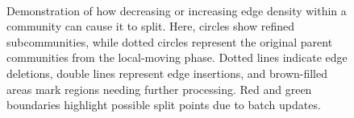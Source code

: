 \begin{figure}[hbtp]
  \centering
   \\[-1ex]
  \caption{Demonstration of how decreasing or increasing edge density within a community can cause it to split. Here, circles show refined subcommunities, while dotted circles represent the original parent communities from the local-moving phase. Dotted lines indicate edge deletions, double lines represent edge insertions, and brown-filled areas mark regions needing further processing. Red and green boundaries highlight possible split points due to batch updates.}
  \label{fig:community-split}
\end{figure}
